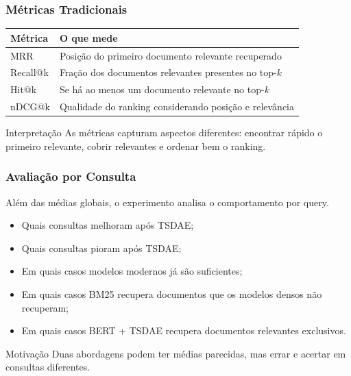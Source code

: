 \documentclass[aspectratio=169]{beamer}
\begin{document}
\begin{frame}
\frametitle{Métricas Tradicionais}

\begin{table}
\centering
\small
\begin{tabular}{@{}ll@{}}
\toprule
\textbf{Métrica} & \textbf{O que mede} \\
\midrule
MRR & Posição do primeiro documento relevante recuperado \\
Recall@k & Fração dos documentos relevantes presentes no top-$k$ \\
Hit@k & Se há ao menos um documento relevante no top-$k$ \\
nDCG@k & Qualidade do ranking considerando posição e relevância \\
\bottomrule
\end{tabular}
\end{table}

\vspace{0.3cm}

\begin{alertblock}{Interpretação}
As métricas capturam aspectos diferentes: encontrar rápido o primeiro relevante, cobrir relevantes e ordenar bem o ranking.
\end{alertblock}

\end{frame}

\begin{frame}
\frametitle{Avaliação por Consulta}

Além das médias globais, o experimento analisa o comportamento por query.

\vspace{0.25cm}

\begin{itemize}
  \item Quais consultas melhoram após TSDAE;
  \item Quais consultas pioram após TSDAE;
  \item Em quais casos modelos modernos já são suficientes;
  \item Em quais casos BM25 recupera documentos que os modelos densos não recuperam;
  \item Em quais casos BERT + TSDAE recupera documentos relevantes exclusivos.
\end{itemize}

\vspace{0.3cm}

\begin{block}{Motivação}
Duas abordagens podem ter médias parecidas, mas errar e acertar em consultas diferentes.
\end{block}

\end{frame}
\end{document}
